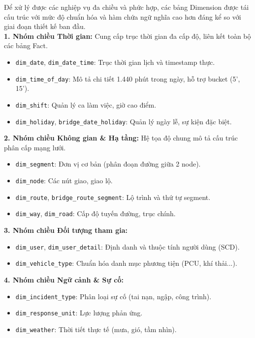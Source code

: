 Để xử lý được các nghiệp vụ đa chiều và phức hợp, các bảng Dimension được tái cấu trúc với mức độ chuẩn hóa và hàm chứa ngữ nghĩa cao hơn đáng kể so với giai đoạn thiết kế ban đầu.\\

\textbf{1. Nhóm chiều Thời gian:}
Cung cấp trục thời gian đa cấp độ, liên kết toàn bộ các bảng Fact.
\begin{itemize}
    \item \texttt{dim\_date}, \texttt{dim\_date\_time}: Trục thời gian lịch và timestamp thực.
    \item \texttt{dim\_time\_of\_day}: Mô tả chi tiết 1.440 phút trong ngày, hỗ trợ bucket (5', 15').
    \item \texttt{dim\_shift}: Quản lý ca làm việc, giờ cao điểm.
    \item \texttt{dim\_holiday}, \texttt{bridge\_date\_holiday}: Quản lý ngày lễ, sự kiện đặc biệt.
\end{itemize}

\textbf{2. Nhóm chiều Không gian \& Hạ tầng:}
Hệ tọa độ chung mô tả cấu trúc phân cấp mạng lưới.
\begin{itemize}
    \item \texttt{dim\_segment}: Đơn vị cơ bản (phân đoạn đường giữa 2 node).
    \item \texttt{dim\_node}: Các nút giao, giao lộ.
    \item \texttt{dim\_route}, \texttt{bridge\_route\_segment}: Lộ trình và thứ tự segment.
    \item \texttt{dim\_way}, \texttt{dim\_road}: Cấp độ tuyến đường, trục chính.
\end{itemize}

\textbf{3. Nhóm chiều Đối tượng tham gia:}
\begin{itemize}
    \item \texttt{dim\_user}, \texttt{dim\_user\_detail}: Định danh và thuộc tính người dùng (SCD).
    \item \texttt{dim\_vehicle\_type}: Chuẩn hóa danh mục phương tiện (PCU, khí thải...).
\end{itemize}

\textbf{4. Nhóm chiều Ngữ cảnh \& Sự cố:}
\begin{itemize}
    \item \texttt{dim\_incident\_type}: Phân loại sự cố (tai nạn, ngập, công trình).
    \item \texttt{dim\_response\_unit}: Lực lượng phản ứng.
    \item \texttt{dim\_weather}: Thời tiết thực tế (mưa, gió, tầm nhìn).
\end{itemize}

